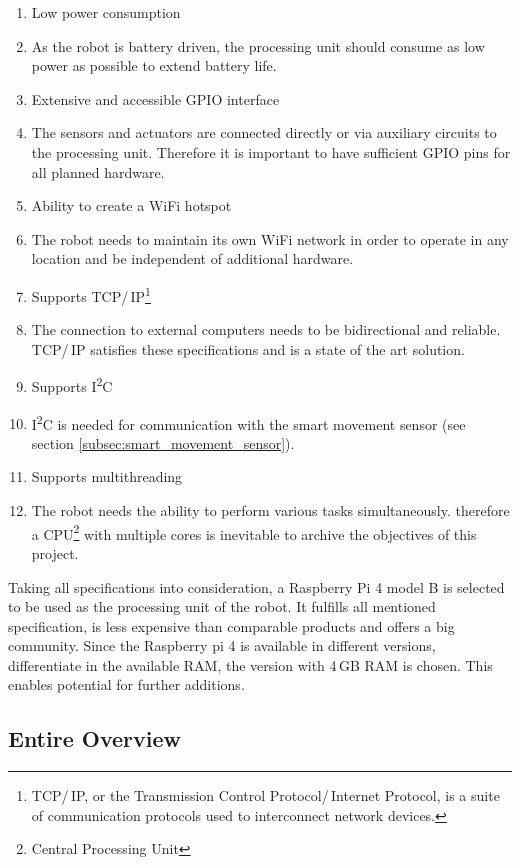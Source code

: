 \begin{enumerate}
\itemsep0em
\item Low power consumption
\item[] As the robot is battery driven, the processing unit should consume as low power as possible to extend battery life.
\item Extensive and accessible GPIO interface
\item[] The sensors and actuators are connected directly or via auxiliary circuits to the processing unit. Therefore it is important to have sufficient GPIO pins for all planned hardware.
\item Ability to create a WiFi hotspot
\item[] The robot needs to maintain its own WiFi network in order to operate in any location and be independent of additional hardware.
\item Supports TCP/\,IP\footnote{TCP/\,IP, or the Transmission Control Protocol/\,Internet Protocol, is a suite of communication protocols used to interconnect network devices.}
\item[] The connection to external computers needs to be bidirectional and reliable. TCP/\,IP satisfies these specifications and is a state of the art solution.
\item Supports I\textsuperscript{2}C
\item[] I\textsuperscript{2}C is needed for communication with the smart movement sensor (see section \ref{subsec:smart_movement_sensor}). 
\item Supports multithreading
\item[] The robot needs the ability to perform various tasks simultaneously. therefore a CPU\footnote{Central Processing Unit} with multiple cores is inevitable to archive the objectives of this project.
\end{enumerate}

Taking all specifications into consideration, a Raspberry Pi 4 model B is selected to be used as the processing unit of the robot. It fulfills all mentioned specification, is less expensive than comparable products and offers a big community. Since the Raspberry pi 4 is available in different versions, differentiate in the available RAM, the version with 4\,GB RAM is chosen. This enables potential for further additions.

\newpage

\subsection{Entire Overview}

